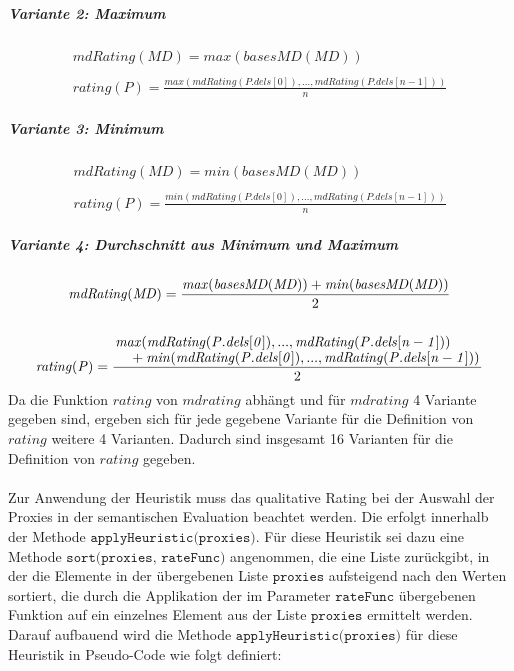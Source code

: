 \documentclass[a4paper,12pt]{article}
\begin{document}
\subparagraph{Variante 2: Maximum}

\begin{gather*}
\mathit{mdRating(MD)} = \mathit{max(basesMD(MD))}
\\\\
\mathit{rating(P)} = \frac{\mathit{max(mdRating(P.dels[0]),...,mdRating(P.dels[n-1]))}}{n}
\end{gather*}



\subparagraph{Variante 3: Minimum}

\begin{gather*}
\mathit{mdRating(MD)} = \mathit{min(basesMD(MD))}
\\\\
\mathit{rating(P)} = \frac{\mathit{min(mdRating(P.dels[0]),...,mdRating(P.dels[n-1]))}}{n}
\end{gather*}

\subparagraph{Variante 4: Durchschnitt aus Minimum und Maximum}

\begin{gather*}
\mathit{mdRating(MD)} = \frac{\mathit{max(basesMD(MD))}+\mathit{min(basesMD(MD))}}{2}
\\\\
\mathit{rating(P)} = \frac{\splitfrac{ \mathit{max(mdRating(P.dels[0]),...,mdRating(P.dels[n-1]))}}{+\mathit{min(mdRating(P.dels[0]),...,mdRating(P.dels[n-1]))}}}{2}
\end{gather*}
\noindent
Da die Funktion $\mathit{rating}$ von $\mathit{mdrating}$ abhängt und für $\mathit{mdrating}$ 4 Variante gegeben sind, ergeben sich für jede gegebene Variante für die Definition von $\mathit{rating}$ weitere 4 Varianten. Dadurch sind insgesamt 16 Varianten für die Definition von $\mathit{rating}$ gegeben.\\\\

Zur Anwendung der Heuristik muss das qualitative Rating bei der Auswahl der Proxies in der semantischen Evaluation beachtet werden. Die erfolgt innerhalb der Methode $\texttt{applyHeuristic(proxies)}$. Für diese Heuristik sei dazu eine Methode $\texttt{sort(proxies, rateFunc)}$ angenommen, die eine Liste zurückgibt, in der die Elemente in der übergebenen Liste $\texttt{proxies}$ aufsteigend nach den Werten sortiert, die durch die Applikation der im Parameter $\texttt{rateFunc}$ übergebenen Funktion auf ein einzelnes Element aus der Liste $\texttt{proxies}$ ermittelt werden. Darauf aufbauend wird die Methode $\texttt{applyHeuristic(proxies)}$ für diese Heuristik in Pseudo-Code wie folgt definiert:
\end{document}
